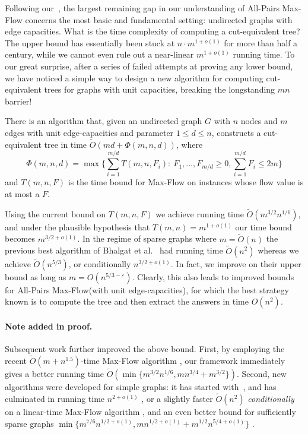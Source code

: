\documentclass{toc}
\theoremstyle{plain}
\newcommand{\ProblemName}[1]{\textsf{#1}}
\newcommand{\MF}{\ProblemName{Max-Flow}\xspace}
\newcommand{\APMF}{\ProblemName{All-Pairs Max-Flow}\xspace}
\newcommand\eps{\varepsilon}
\newcommand\tO{\ensuremath{\widetilde O}}  %
\begin{document}
\medskip

Following our~, the largest remaining gap in our understanding of \APMF concerns the most basic and fundamental setting: undirected graphs with edge capacities. What is the time complexity of computing a cut-equivalent tree? The upper bound has essentially been stuck at $n \cdot m^{1+o(1)}$ for more than half a century, while we cannot even rule out a near-linear $m^{1+o(1)}$ running time.
To our great surprise, after a series of failed attempts at proving any lower bound, we have noticed a simple way to design a new algorithm for computing cut-equivalent trees for graphs with unit capacities, breaking the longstanding $mn$ barrier!

\begin{theorem}\label{Theorem:Algorithm}
  There is an algorithm that, given an undirected graph $G$ with $n$ nodes and $m$ edges
%
with unit edge-capacities
and parameter $1\le d \le n$, constructs a cut-equivalent tree in time
%
  ${\tO}( md + \Phi(m,n,d) )$,      %
  where
  \[
    \Phi(m,n,d)=\max\Big\{\sum_{i=1}^{m/d} T(m,n,F_i):\ F_1,\dots,F_{m/d}\geq 0,\sum_{i=1}^{m/d} F_i\leq 2m \Big\}
  \]
  and $T(m,n,F)$ is the time bound for \MF on instances
%
whose
flow value is at most a $F$.
\end{theorem}


Using the current bound on $T(m,n,F)$ we achieve running time
%
  ${\tO}(m^{3/2}n^{1/6})$,       %
and under the plausible hypothesis that $T(m,n)=m^{1+o(1)}$
our time bound becomes $m^{3/2 + o(1)}$.
In the regime of sparse graphs where $m=\tO(n)$ the previous best algorithm of Bhalgat et al.~\cite{BHKP07} had running time
%
  ${\tO}(n^2)$      %
whereas we achieve $\tO(n^{5/3})$, or conditionally $n^{3/2+o(1)}$.
In fact, we improve on their upper bound as long as $m=O(n^{5/3-\eps})$.
Clearly, this also leads to improved bounds for \APMF (with unit edge-capacities), for which the best strategy known is to compute the tree
and then extract the answers in time $O(n^2)$.

\paragraph{Note added in proof.}
Subsequent work further improved the above bound.
First, by employing the recent $\widetilde{O}(m+n^{1.5})$-time \MF algorithm \cite{linearflow21},
our framework immediately gives a better running time $\widetilde{O}(\min\{m^{3/2}n^{1/6},mn^{3/4}+m^{3/2}\})$.
Second, new algorithms were developed for simple graphs:
it has started with~\cite{AKT21_stoc},
and has culminated in running time $n^{2+o(1)}$ \cite{AKT21_arxiv,LPS21},
or a slightly faster $\widetilde{O}(n^2)$ \emph{conditionally} on a linear-time \MF algorithm \cite{Zhang21},
and an even better bound for sufficiently sparse graphs
$\min \{ m^{7/6}n^{1/2+o(1)} , m n^{1/2+o(1)}+m^{1/2}n^{5/4+o(1)} \}$ \cite{LPS21}.
\end{document}
